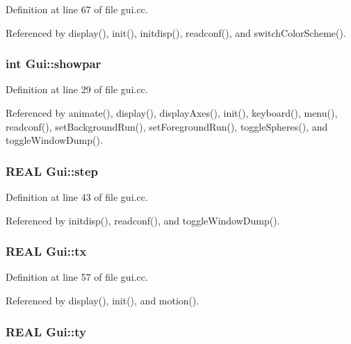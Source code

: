 Definition at line 67 of file gui.cc.

Referenced by display(), init(), initdisp(), readconf(), and switchColorScheme().\hypertarget{namespaceGui_aa991dcea49b723b5d30bbf0fa3cec6c}{
\subsubsection[{showpar}]{\setlength{\rightskip}{0pt plus 5cm}int {\bf Gui::showpar}}}
\label{namespaceGui_aa991dcea49b723b5d30bbf0fa3cec6c}




Definition at line 29 of file gui.cc.

Referenced by animate(), display(), displayAxes(), init(), keyboard(), menu(), readconf(), setBackgroundRun(), setForegroundRun(), toggleSpheres(), and toggleWindowDump().\hypertarget{namespaceGui_8ef4f3e30c066fc451103c29d312ebfc}{
\subsubsection[{step}]{\setlength{\rightskip}{0pt plus 5cm}REAL {\bf Gui::step}}}
\label{namespaceGui_8ef4f3e30c066fc451103c29d312ebfc}




Definition at line 43 of file gui.cc.

Referenced by initdisp(), readconf(), and toggleWindowDump().\hypertarget{namespaceGui_0d144586c178c9eb8a740d3209e83111}{
\subsubsection[{tx}]{\setlength{\rightskip}{0pt plus 5cm}REAL {\bf Gui::tx}}}
\label{namespaceGui_0d144586c178c9eb8a740d3209e83111}




Definition at line 57 of file gui.cc.

Referenced by display(), init(), and motion().\hypertarget{namespaceGui_ae6dc6eb71aeb72299e638a67fe2d1bd}{
\subsubsection[{ty}]{\setlength{\rightskip}{0pt plus 5cm}REAL {\bf Gui::ty}}}
\label{namespaceGui_ae6dc6eb71aeb72299e638a67fe2d1bd}




